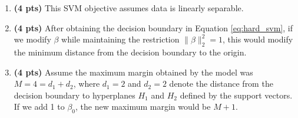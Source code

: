 \documentclass{article}
\begin{document}
\begin{enumerate}[1.]

\item {\bf (4 pts)} This SVM objective assumes data is linearly separable. 
        
        
\begin{tcolorbox}[breakable,
enhanced,
notitle,
width=16.6cm,
height=3cm]
%
%
\end{tcolorbox}

        
\item {\bf (4 pts)} After obtaining the decision boundary in Equation \ref{eq:hard_svm}, if we modify $\beta$ while maintaining the restriction $\|\beta\|^2_{2}=1$, this would modify the minimum distance from the decision boundary to the origin. 

\begin{tcolorbox}[breakable,
enhanced,
notitle,
width=16.6cm,
height=3cm]

%
%
\end{tcolorbox}

\item {\bf (4 pts)} Assume the maximum margin obtained by the model was $M=4 = d_1 + d_2$, where  $d_1=2$ and $d_2=2$ denote the distance from the decision boundary to hyperplanes $H_1$ and $H_2$ defined by the support vectors. If we add 1 to $\beta_0$, the new maximum margin would be $M+1$.

\begin{tcolorbox}[breakable,
enhanced,
notitle,
width=16.6cm,
height=3cm]  
%
%
\end{tcolorbox}
        

\end{enumerate}
\end{document}
